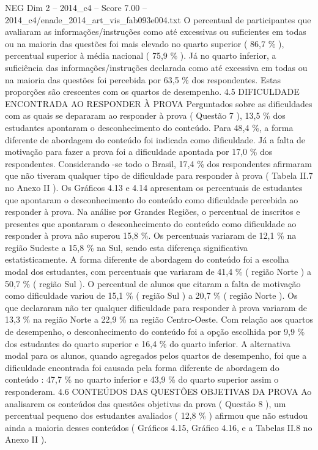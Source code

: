 \begin{textsample}{NEG Dim 2 – 2014\_c4 – Score 7.00 – 2014\_c4/enade\_2014\_art\_vis\_fab093e004.txt}
O percentual de participantes que avaliaram as informações/instruções como até excessivas ou suficientes em todas ou na maioria das questões foi mais elevado no quarto superior ( 86,7 \% ), percentual superior à média nacional ( 75,9 \% ).
Já no quarto inferior, a suficiência das informações/instruções declarada como até excessiva em todas ou na maioria das questões foi percebida por 63,5 \% dos respondentes.
Estas proporções são crescentes com os quartos de desempenho. 4.5 DIFICULDADE ENCONTRADA AO RESPONDER À PROVA Perguntados sobre as dificuldades com as quais se depararam ao responder à prova ( Questão 7 ), 13,5 \% dos estudantes apontaram o desconhecimento do conteúdo.
Para 48,4 \%, a forma diferente de abordagem do conteúdo foi indicada como dificuldade.
Já a falta de motivação para fazer a prova foi a dificuldade apontada por 17,0 \% dos respondentes.
Considerando -se todo o Brasil, 17,4 \% dos respondentes afirmaram que não tiveram qualquer tipo de dificuldade para responder à prova ( Tabela II.7 no Anexo II ).
Os Gráficos 4.13 e 4.14 apresentam os percentuais de estudantes que apontaram o desconhecimento do conteúdo como dificuldade percebida ao responder à prova.
Na análise por Grandes Regiões, o percentual de inscritos e presentes que apontaram o desconhecimento do conteúdo como dificuldade ao responder à prova não superou 15,8 \%.
Os percentuais variaram de 12,1 \% na região Sudeste a 15,8 \% na Sul, sendo esta diferença significativa estatisticamente.
A forma diferente de abordagem do conteúdo foi a escolha modal dos estudantes, com percentuais que variaram de 41,4 \% ( região Norte ) a 50,7 \% ( região Sul ).
O percentual de alunos que citaram a falta de motivação como dificuldade variou de 15,1 \% ( região Sul ) a 20,7 \% ( região Norte ).
Os que declararam não ter qualquer dificuldade para responder à prova variaram de 13,3 \% na região Norte a 22,9 \% na região Centro-Oeste.
Com relação aos quartos de desempenho, o desconhecimento do conteúdo foi a opção escolhida por 9,9 \% dos estudantes do quarto superior e 16,4 \% do quarto inferior.
A alternativa modal para os alunos, quando agregados pelos quartos de desempenho, foi que a dificuldade encontrada foi causada pela forma diferente de abordagem do conteúdo : 47,7 \% no quarto inferior e 43,9 \% do quarto superior assim o responderam. 4.6 CONTEÚDOS DAS QUESTÕES OBJETIVAS DA PROVA Ao analisarem os conteúdos das questões objetivas da prova ( Questão 8 ), um percentual pequeno dos estudantes avaliados ( 12,8 \% ) afirmou que não estudou ainda a maioria desses conteúdos ( Gráficos 4.15, Gráfico 4.16, e a Tabelas II.8 no Anexo II ).

\end{textsample}
